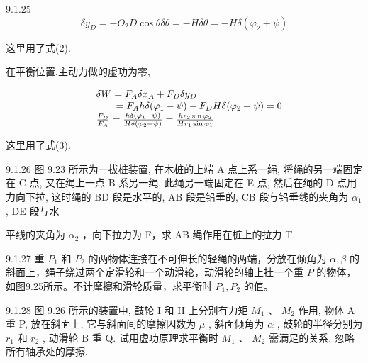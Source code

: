 \begin{problem}{9.1.25}
\[
\delta y _ {D} = - O _ {2} D \cos \theta \delta \theta = - H \delta \theta = - H \delta (\varphi_ {2} + \psi)
\]

这里用了式(2).

在平衡位置,主动力做的虚功为零,

\[
\begin{array}{r l} & {\delta W = F _ {A} \delta x _ {A} + F _ {D} \delta y _ {D}} \\ & {\qquad = F _ {A} h \delta (\varphi_ {1} - \psi) - F _ {D} H \delta (\varphi_ {2} + \psi) = 0} \\ & {\frac {F _ {D}}{F _ {A}} = \frac {h \delta (\varphi_ {1} - \psi)}{H \delta (\varphi_ {2} + \psi)} = \frac {h r _ {2} \sin \varphi_ {2}}{H r _ {1} \sin \varphi_ {1}}} \end{array}
\]

这里用了式(3).
\begin{center}

\end{center}
\begin{center}

\end{center}
\end{problem}
\clearpage


\begin{problem}{9.1.26}
图 9.23 所示为一拔桩装置, 在木桩的上端 A 点上系一绳, 将绳的另一端固定在 C 点, 又在绳上一点 B 系另一绳, 此绳另一端固定在 E 点, 然后在绳的 D 点用力向下拉, 这时绳的 BD 段是水平的, AB 段是铅垂的, CB 段与铅垂线的夹角为 $\alpha_{1}$ , DE 段与水

平线的夹角为 $\alpha_{2}$ ，向下拉力为 F，求 AB 绳作用在桩上的拉力 T.
\begin{center}

\end{center}
\end{problem}
\clearpage


\begin{problem}{9.1.27}
重 $P_{1}$ 和 $P_{2}$ 的两物体连接在不可伸长的轻绳的两端，分放在倾角为 $\alpha, \beta$ 的斜面上，绳子绕过两个定滑轮和一个动滑轮，动滑轮的轴上挂一个重 $P$ 的物体，如图9.25所示。不计摩擦和滑轮质量，求平衡时 $P_{1}, P_{2}$ 的值。
\begin{center}

\end{center}
\end{problem}
\clearpage


\begin{problem}{9.1.28}
图 9.26 所示的装置中, 鼓轮 I 和 II 上分别有力矩 $M_{1}$ 、 $M_{2}$ 作用, 物体 A 重 P, 放在斜面上, 它与斜面间的摩擦因数为 $\mu$ , 斜面倾角为 $\alpha$ , 鼓轮的半径分别为 $r_{1}$ 和 $r_{2}$ , 动滑轮 B 重 Q. 试用虚功原理求平衡时 $M_{1}$ 、 $M_{2}$ 需满足的关系. 忽略所有轴承处的摩擦.
\begin{center}

\end{center}
\end{problem}
\clearpage


